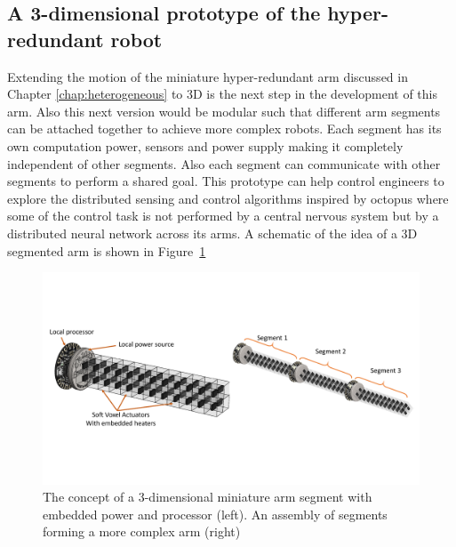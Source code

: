 \subsection{A 3-dimensional prototype of the hyper-redundant robot}
Extending the motion of the miniature hyper-redundant arm discussed in Chapter \ref{chap:heterogeneous} to 3D is the next step in the development of this arm. Also this next version would be modular such that different arm segments can be attached together to achieve more complex robots. Each segment has its own computation power, sensors and power supply making it completely independent of other segments. Also each segment can communicate with other segments to perform a shared goal. This prototype can help control engineers to explore the distributed sensing and control algorithms inspired by octopus where some of the control task is not performed by a central nervous system but by a distributed neural network across its arms. A schematic of the idea of a 3D segmented arm is shown in Figure~\ref{fig:3Darm}
\begin{figure}[!t]
\centering
\includegraphics[width=\textwidth]{3Darm.pdf}
    \caption[]{The concept of a 3-dimensional miniature arm segment with embedded power and processor (left). An assembly of segments forming a more complex arm (right)}
    \label{fig:3Darm}
\end{figure}

